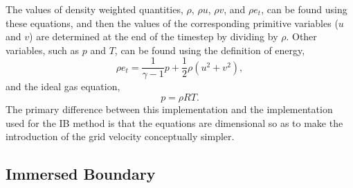 \documentclass{article}
\begin{document}
The values of density weighted quantities, $\rho$, $\rho u$, $\rho v$, and $\rho e_t$, can be found using these equations, and then the values of the corresponding primitive variables ($u$ and $v$) are determined at the end of the timestep by dividing by $\rho$.  Other variables, such as $p$ and $T$, can be found using the definition of energy,
\begin{equation}
  \rho e_t = \frac{1}{\gamma -1} p + \frac{1}{2} \rho (u^2 + v^2),
\end{equation}
 and the ideal gas equation,
\begin{equation}
  p = \rho R T.
\end{equation}
The primary difference between this implementation and the implementation used for the IB method is that the equations are dimensional so as to make the introduction of the grid velocity conceptually simpler. \\

\subsection{Immersed Boundary}
\end{document}
